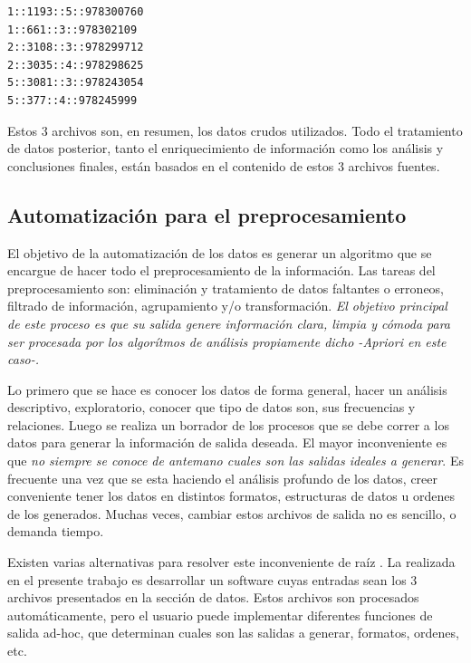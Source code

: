 \documentclass[journal]{IEEEtran}
\begin{document}
\begin{enumerate}
\begin{itemize}
        \begin{lstlisting}[frame=single,breaklines=true]
1::1193::5::978300760
1::661::3::978302109
2::3108::3::978299712
2::3035::4::978298625
5::3081::3::978243054
5::377::4::978245999
        \end{lstlisting}
    \end{itemize}

\end{enumerate}

Estos 3 archivos son, en resumen, los datos crudos utilizados. 
Todo el tratamiento de datos posterior, tanto el enriquecimiento de información como los
análisis y conclusiones finales, están basados en el contenido de estos 3 archivos
fuentes.

\subsection{Automatización para el preprocesamiento}
El objetivo de la automatización de los datos es generar un algoritmo que se encargue
de hacer todo el preprocesamiento de la información. Las tareas del preprocesamiento
son: eliminación  y tratamiento  de datos faltantes o erroneos, filtrado de información,
agrupamiento y/o transformación.
\emph{El objetivo principal de este proceso es que su salida genere información clara, limpia y cómoda
para ser procesada por los algorítmos de análisis propiamente dicho -Apriori en este caso-.}

Lo primero que se hace es conocer los datos de forma general, hacer un análisis descriptivo,
exploratorio, conocer que tipo de datos son, sus frecuencias y relaciones. Luego se realiza un
borrador de los procesos que se debe correr a los datos para generar la información de salida 
deseada. El mayor inconveniente es que \emph{no siempre se conoce de antemano cuales son las
salidas ideales a generar}. Es frecuente una vez que se esta haciendo el análisis profundo
de los datos, creer conveniente tener los datos en distintos formatos, estructuras de
datos u ordenes de los generados. Muchas veces, cambiar estos archivos de salida no 
es sencillo, o demanda tiempo.

Existen varias alternativas para resolver este inconveniente de raíz
. La realizada en el presente
trabajo es desarrollar un software cuyas entradas sean los 3 archivos presentados en 
la sección de datos. Estos archivos son procesados automáticamente, pero el usuario
puede implementar diferentes funciones de salida ad-hoc, que determinan cuales son
las salidas a generar, formatos, ordenes, etc.
\end{document}
